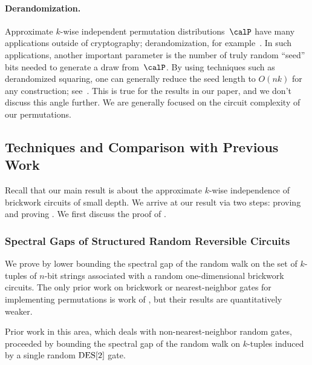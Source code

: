 \paragraph{Derandomization.} Approximate $k$-wise independent permutation distributions~$\calP$ have many applications outside of cryptography; derandomization, for example~\cite{mohanty2020explicit}. In such applications, another important parameter is the number of truly random ``seed'' bits needed to generate a draw from~$\calP$. By using techniques such as derandomized squaring, one can generally reduce the seed length to $O(nk)$ for any construction; see~\cite{kaplan2009derandomized}. This is true for the results in our paper, and we don't discuss this angle further. We are generally focused on the circuit complexity of our permutations.


\subsection{Techniques and Comparison with Previous Work}
Recall that our main result  is about the approximate $k$-wise independence of brickwork circuits of small depth. We arrive at our result via two steps: proving  and proving . We first discuss the proof of .

\subsubsection{Spectral Gaps of Structured Random Reversible Circuits}
We prove  by lower bounding the spectral gap of the random walk on the set of $k$-tuples of $n$-bit strings associated with a random one-dimensional brickwork circuits. The only prior work on brickwork or nearest-neighbor gates for implementing permutations is work of \cite{feng2024dynamics}, but their results are quantitatively weaker. 

Prior work in this area, which deals with non-nearest-neighbor random gates, proceeded by bounding the spectral gap of the random walk on $k$-tuples induced by a single random $\mathrm{DES}[2]$ gate. 

